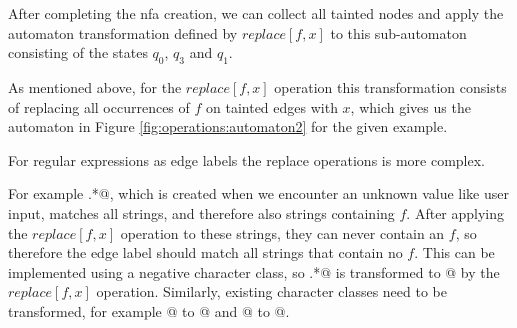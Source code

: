 After completing the \ac{nfa} creation, we can collect all tainted nodes and apply the automaton transformation defined by $replace[f,x]$ to this sub-automaton consisting of the states $q_0$, $q_3$ and $q_1$.

As mentioned above, for the $replace[f,x]$ operation this transformation consists of replacing all occurrences of $f$ on tainted edges with $x$, which gives us the automaton in Figure \ref{fig:operations:automaton2} for the given example.

For regular expressions as edge labels the replace operations is more complex.

For example \Verb@.*@, which is created when we encounter an unknown value like user input, matches all strings, and therefore also strings containing $f$. After applying the $replace[f,x]$ operation to these strings, they can never contain an $f$, so therefore the edge label should match all strings that contain no $f$. This can be implemented using a negative character class, so \Verb@.*@ is transformed to \Verb@[^f]@ by the $replace[f,x]$ operation. Similarly, existing character classes need to be transformed, for example \Verb@[abf]@ to \Verb@[abx]@ and \Verb@[^ab]@ to \Verb@[^abf]@.

